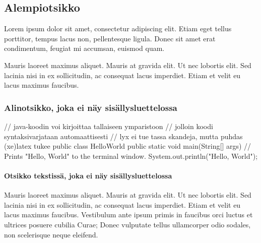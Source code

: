 \subsection{Alempiotsikko}

\label{Alempiotsikko}

Lorem ipsum dolor sit amet, consectetur adipiscing elit. Etiam eget
tellus porttitor, tempus lacus non, pellentesque ligula. Donec sit
amet erat condimentum, feugiat mi accumsan, euismod quam.

Mauris laoreet maximus aliquet. Mauris at gravida elit. Ut nec lobortis
elit. Sed lacinia nisi in ex sollicitudin, ac consequat lacus imperdiet.
Etiam et velit eu lacus maximus faucibus.

\subsubsection{Alinotsikko, joka ei näy sisällysluettelossa}

\label{Alinotsikko}
\begin{javacode}
// java-koodin voi kirjoittaa tallaiseen ymparistoon
// jolloin koodi syntaksivarjataan automaattisesti
// lyx ei tue tassa skandeja, mutta puhdas (xe)latex tukee
public class HelloWorld {
  public static void main(String[] args) {
    // Prints "Hello, World" to the terminal window.
    System.out.println("Hello, World");
  }
}
\end{javacode}

\paragraph{Otsikko tekstissä, joka ei näy sisällysluettelossa}

Mauris laoreet maximus aliquet. Mauris at gravida elit. Ut nec lobortis
elit. Sed lacinia nisi in ex sollicitudin, ac consequat lacus imperdiet.
Etiam et velit eu lacus maximus faucibus. Vestibulum ante ipsum primis
in faucibus orci luctus et ultrices posuere cubilia Curae; Donec vulputate
tellus ullamcorper odio sodales, non scelerisque neque eleifend. 

